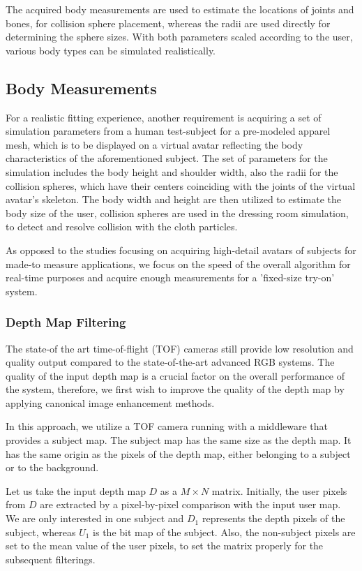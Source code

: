 \documentclass[number,preprint,review,12pt]{elsarticle}
\begin{document}
The acquired body measurements are used to estimate the locations of joints and bones, for collision sphere placement, whereas the radii are used directly for determining the sphere sizes. With both parameters scaled according to the user, various body types can be simulated realistically.

\subsection{Body Measurements}
\label{subsec:Measurements}
For a realistic fitting experience, another requirement is acquiring a set of simulation parameters from a human test-subject for a pre-modeled apparel mesh, which is to be displayed on a virtual avatar reflecting the body characteristics of the aforementioned subject.  The set of parameters for the simulation includes the body height and shoulder width, also the radii for the collision spheres, which have their centers coinciding with the joints of the virtual avatar's skeleton.
The body width and height are then utilized to estimate the body size of the user, collision spheres are used in the dressing room simulation, to detect and resolve collision with the cloth particles.

As opposed to the studies focusing on acquiring high-detail avatars of subjects for made-to measure applications, we focus on the speed of the overall algorithm for real-time purposes and acquire enough measurements for a 'fixed-size try-on' system.   
  
\subsubsection{Depth Map Filtering}
\label{subsubsec:4.1} 
The state-of the art time-of-flight (TOF) cameras still provide low resolution and quality output compared to the state-of-the-art advanced RGB systems. The quality of the input depth map is a crucial factor on the overall performance of the system, therefore, we first wish to improve the quality of the depth map by applying canonical image enhancement methods.

In this approach, we utilize a TOF camera running with a middleware that provides a subject map. The subject map has the same size as the depth map. It has the same origin as the pixels of the depth map, either belonging to a subject or to the background.

Let us take the input depth map $D$ as a $M \times N$ matrix. Initially, the user pixels from $D$ are extracted by a pixel-by-pixel comparison with the input user map. We are only interested in one subject and $D_1$ represents the depth pixels of the subject, whereas $U_1$ is the bit map of the subject. Also, the non-subject pixels are set to the mean value of the user pixels, to set the matrix properly for the subsequent filterings.
\end{document}
